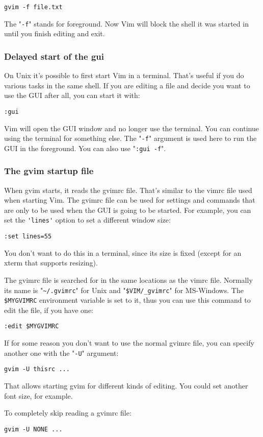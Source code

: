 \begin{Verbatim}[samepage=true]
 gvim -f file.txt
\end{Verbatim}

The "\verb!-f!" stands for foreground.
Now Vim will block the shell it was started in until you finish editing and exit.

\subsubsection{Delayed start of the gui}
On Unix it's possible to first start Vim in a terminal.
That's useful if you do various tasks in the same shell.
If you are editing a file and decide you want to use the GUI after all, you can start it with:

\begin{Verbatim}[samepage=true]
 :gui
\end{Verbatim}

Vim will open the GUI window and no longer use the terminal.
You can continue using the terminal for something else.
The "\verb!-f!" argument is used here to run the GUI in the foreground.
You can also use "\verb!:gui -f!".

\subsubsection{The gvim startup file}
When gvim starts, it reads the gvimrc file.
That's similar to the vimrc file used when starting Vim.
The gvimrc file can be used for settings and commands that are only to be used when the GUI is going to be started.
For example, you can set the \verb!'lines'! option to set a different window size:

\begin{Verbatim}[samepage=true]
 :set lines=55
\end{Verbatim}

You don't want to do this in a terminal, since its size is fixed (except for an xterm that supports resizing).

The gvimrc file is searched for in the same locations as the vimrc file.
Normally its name is "\verb!~/.gvimrc!" for Unix and "\verb!$VIM/_gvimrc!" for MS-Windows.
The \verb!$MYGVIMRC! environment variable is set to it, thus you can use this command to edit the file, if you have one:

\begin{Verbatim}[samepage=true]
 :edit $MYGVIMRC
\end{Verbatim}

If for some reason you don't want to use the normal gvimrc file, you can specify another one with the "\verb!-U!" argument:

\begin{Verbatim}[samepage=true]
 gvim -U thisrc ...
\end{Verbatim}

That allows starting gvim for different kinds of editing.
You could set another font size, for example.

To completely skip reading a gvimrc file:

\begin{Verbatim}[samepage=true]
 gvim -U NONE ...
\end{Verbatim}
\clearpage
